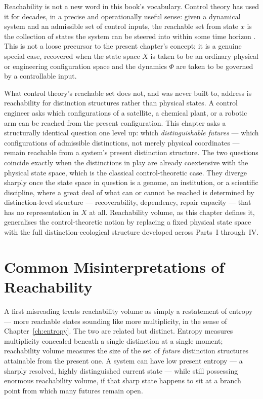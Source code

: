 \documentclass[12pt,twoside,openright]{book}
\begin{document}
Reachability is not a new word in this book's vocabulary.
Control theory has used it for decades, in a precise and
operationally useful sense: given a dynamical system and an
admissible set of control inputs, the reachable set from
state $x$ is the collection of states the system can be
steered into within some time horizon
\parencite{kalman1960,sontag1998}. This is not a loose
precursor to the present chapter's concept; it is a genuine
special case, recovered when the state space $X$ is taken to
be an ordinary physical or engineering configuration space
and the dynamics $\Phi$ are taken to be governed by a
controllable input.

What control theory's reachable set does not, and was never
built to, address is reachability for distinction structures
rather than physical states. A control engineer asks which
configurations of a satellite, a chemical plant, or a robotic
arm can be reached from the present configuration. This
chapter asks a structurally identical question one level up:
which \emph{distinguishable futures} --- which configurations
of admissible distinctions, not merely physical coordinates
--- remain reachable from a system's present distinction
structure. The two questions coincide exactly when the
distinctions in play are already coextensive with the
physical state space, which is the classical
control-theoretic case. They diverge sharply once the state
space in question is a genome, an institution, or a
scientific discipline, where a great deal of what can or
cannot be reached is determined by distinction-level
structure --- recoverability, dependency, repair capacity ---
that has no representation in $X$ at all. Reachability volume,
as this chapter defines it, generalises the control-theoretic
notion by replacing a fixed physical state space with the
full distinction-ecological structure developed across
Parts~I through~IV.

\section{Common Misinterpretations of Reachability}
\label{sec:ch13-misinterpretations}

A first misreading treats reachability volume as simply a
restatement of entropy --- more reachable states sounding
like more multiplicity, in the sense of
Chapter~\ref{ch:entropy}. The two are related but distinct.
Entropy measures multiplicity concealed beneath a single
distinction at a single moment; reachability volume measures
the size of the set of \emph{future} distinction structures
attainable from the present one. A system can have low
present entropy --- a sharply resolved, highly distinguished
current state --- while still possessing enormous
reachability volume, if that sharp state happens to sit at a
branch point from which many futures remain open.
\end{document}
